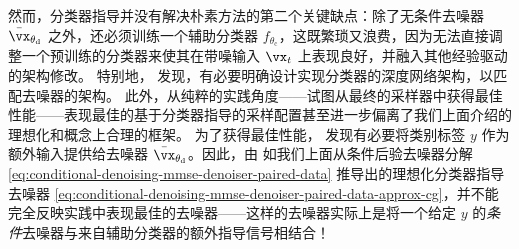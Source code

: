 \documentclass[../../book-main_zh.tex]{subfiles}
\begin{document}

然而，分类器指导并没有解决朴素方法的第二个关键缺点：除了无条件去噪器 $\bar{\vx}_{\theta_{\mathrm{d}}}$ 之外，还必须训练一个辅助分类器 $f_{\theta_{\mathrm{c}}}$，这既繁琐又浪费，因为无法直接调整一个预训练的分类器来使其在带噪输入 $\vx_t$ 上表现良好，并融入其他经验驱动的架构修改。
特别地，\citet{Dhariwal2021-hg} 发现，有必要明确设计实现分类器的深度网络架构，以匹配去噪器的架构。
此外，从纯粹的实践角度——试图从最终的采样器中获得最佳性能——表现最佳的基于分类器指导的采样配置甚至进一步偏离了我们上面介绍的理想化和概念上合理的框架。
为了获得最佳性能，\citet{Dhariwal2021-hg} 发现有必要将类别标签 $y$ 作为额外输入提供给去噪器 $\bar{\vx}_{\theta_{\mathrm{d}}}$。因此，由 \citet{Dhariwal2021-hg} 如我们上面从条件后验去噪器分解 \eqref{eq:conditional-denoising-mmse-denoiser-paired-data} 推导出的理想化分类器指导去噪器 \eqref{eq:conditional-denoising-mmse-denoiser-paired-data-approx-cg}，并不能完全反映实践中表现最佳的去噪器——这样的去噪器实际上是将一个给定 $y$ 的\textit{条件}去噪器与来自辅助分类器的额外指导信号相结合！
\end{document}
